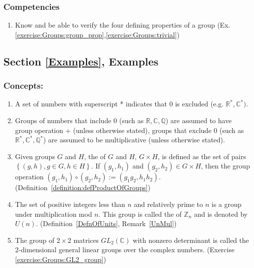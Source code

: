 \subsubsection*{Competencies}
\begin{enumerate}
\item
Know and be able to verify the four defining properties of a group (Ex. \ref{exercise:Groups:group_prop},\ref{exercise:Groups:trivial})
\end{enumerate}


\subsection*{Section \ref{Examples}, Examples}
\subsubsection*{Concepts:}
\begin{enumerate}
\item
A set of numbers  with superscript * indicates that 0 is excluded  (e.g. $\mathbb{R}^{\ast},\mathbb{C}^{\ast})$.
\item
Groups of numbers that include 0 (such as ${\mathbb R}, {\mathbb C}, {\mathbb Q}$) are assumed to have group operation + (unless otherwise stated),  groups that exclude 0 (such as ${\mathbb R}^{\ast}, {\mathbb C}^{\ast}, {\mathbb Q}^{\ast}$) are assumed to be multiplicative (unless otherwise stated).
\item
Given groups $G$ and $H$, the  of $G$ and $H$, $G \times H$, is defined as the set of pairs $\left\{(g,h), g \in G, h \in H \right\}$.  If $(g_1, h_1)$ and $(g_2, h_2) \in G \times H$, then the group operation $(g_1, h_1) \circ (g_2, h_2) := (g_1g_2, h_1h_2)$. (Definition~\ref{definition:defProductOfGroups})
\item
The set of positive integers less than $n$ and relatively prime to $n$ is a group under multiplication mod $n$. This group is called the  of ${\mathbb Z}_n$  and is denoted by $U(n)$.  (Definition~\ref{DefnOfUnits}, Remark~\ref{UnMul})
\item
The group of $2 \times 2$ matrices $GL_2({\mathbb C})$ with nonzero determinant is called the 2-dimensional general linear groups over the complex numbers. (Exercise \ref{exercise:Groups:GL2_group})
\end{enumerate}

